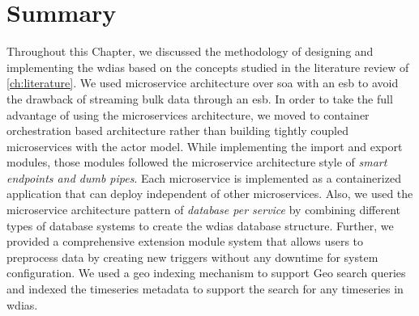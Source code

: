 \section{Summary}
\label{se:method_summary}

Throughout this Chapter, we discussed the methodology of designing and implementing the \acrshort{wdias} based on the concepts studied in the literature review of \cref{ch:literature}. We used microservice architecture over \acrshort{soa} with an \acrshort{esb} to avoid the drawback of streaming bulk data through an \acrshort{esb}. In order to take the full advantage of using the microservices architecture, we moved to container orchestration based architecture rather than building tightly coupled microservices with the actor model. 
While implementing the import and export modules, those modules followed the microservice architecture style of \emph{smart endpoints and dumb pipes}. Each microservice is implemented as a containerized application that can deploy independent of other microservices. Also, we used the microservice architecture pattern of \emph{database per service} by combining different types of database systems to create the \acrshort{wdias} database structure. Further, we provided a comprehensive extension module system that allows users to preprocess data by creating new triggers without any downtime for system configuration. We used a geo indexing mechanism to support Geo search queries and indexed the timeseries metadata to support the search for any timeseries in \acrshort{wdias}.
